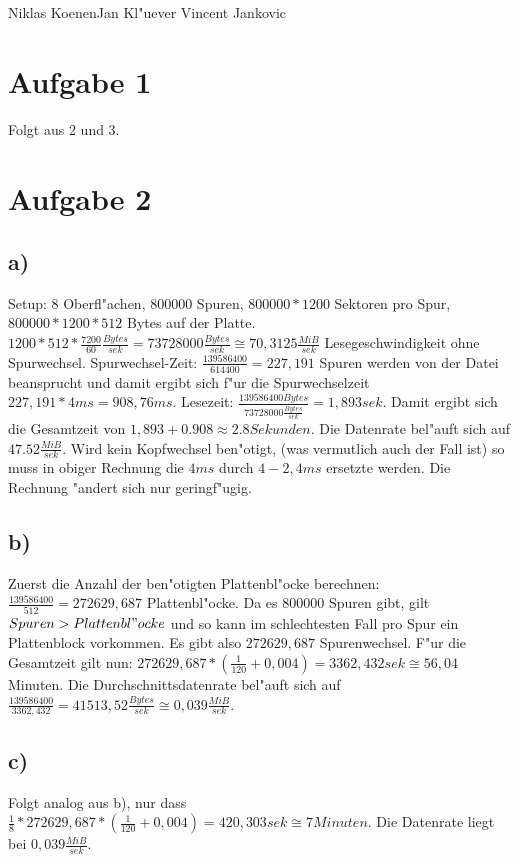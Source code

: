 \documentclass{ti2}
\begin{document}
%
                {Niklas Koenen}{Jan Kl"uever}%
                {Vincent Jankovic}{}%
\section*{Aufgabe 1}
Folgt aus 2 und 3.
\section*{Aufgabe 2}

\subsection*{a)}
Setup: 8 Oberfl"achen, $800000$ Spuren, $800000 * 1200$ Sektoren pro Spur, $800000*1200*512$ Bytes auf der Platte.
$1200 * 512 * \frac{7200}{60} \frac{Bytes}{sek}=73728000 \frac{Bytes}{sek} \cong 70,3125 \frac{MiB}{sek}$ Lesegeschwindigkeit ohne Spurwechsel. Spurwechsel-Zeit: $\frac{139586400}{614400}=227,191$ Spuren werden von der Datei beansprucht und damit ergibt sich f"ur die Spurwechselzeit $227,191 * 4 ms = 908,76 ms$. Lesezeit: $\frac{139586400 Bytes}{73728000 \frac{Bytes}{sek}}= 1,893 sek$. Damit ergibt sich die Gesamtzeit von $1,893+0.908 \approx 2.8 Sekunden$. Die Datenrate bel"auft sich auf $47.52 \frac{MiB}{sek}$. Wird kein Kopfwechsel ben"otigt, (was vermutlich auch der Fall ist) so muss in obiger Rechnung die $4ms$ durch $ 4 - 2,4 ms$ ersetzte werden. Die Rechnung "andert sich nur geringf"ugig.
\subsection*{b)}
Zuerst die Anzahl der ben"otigten Plattenbl"ocke berechnen: $\frac{139586400}{512}=272629,687$ Plattenbl"ocke. Da es 800000 Spuren gibt, gilt $Spuren > Plattenbl"ocke$ und so kann im schlechtesten Fall pro Spur ein Plattenblock vorkommen. Es gibt also $272629,687$ Spurenwechsel. F"ur die Gesamtzeit gilt nun: $272629,687*(\frac{1}{120}+0,004)=3362,432 sek \cong 56,04$ Minuten. Die Durchschnittsdatenrate bel"auft sich auf $\frac{139586400}{3362,432}=41513,52 \frac{Bytes}{sek} \cong 0,039 \frac{MiB}{sek}$.
\subsection*{c)}
Folgt analog aus b), nur dass $\frac{1}{8}*272629,687*(\frac{1}{120}+0,004)=420,303 sek \cong 7 Minuten$. Die Datenrate liegt bei $
0,039 \frac{MiB}{sek}$.
\end{document}
